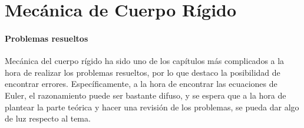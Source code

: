 \documentclass[/home/hernan/Documentos/Apuntes_mecanica_teorica/main.tex]{subfiles}
\begin{document}
    \part{Mecánica de Cuerpo Rígido}


    \subsection{Problemas resueltos}

    Mecánica del cuerpo rígido ha sido uno de los capítulos más complicados a la hora de realizar los problemas resueltos, por lo que destaco la posibilidad de encontrar errores. Específicamente, a la hora de encontrar las ecuaciones de Euler, el razonamiento puede ser bastante difuso, y se espera que a la hora de plantear la parte teórica y hacer una revisión de los problemas, se pueda dar algo de luz respecto al tema.

    
\end{document}
